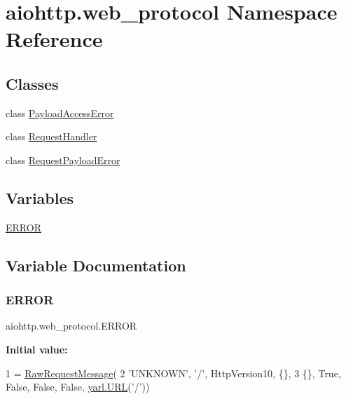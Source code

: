\hypertarget{namespaceaiohttp_1_1web__protocol}{}\section{aiohttp.\+web\+\_\+protocol Namespace Reference}
\label{namespaceaiohttp_1_1web__protocol}
\subsection*{Classes}
\begin{DoxyCompactItemize}
\item 
class \hyperlink{classaiohttp_1_1web__protocol_1_1_payload_access_error}{Payload\+Access\+Error}
\item 
class \hyperlink{classaiohttp_1_1web__protocol_1_1_request_handler}{Request\+Handler}
\item 
class \hyperlink{classaiohttp_1_1web__protocol_1_1_request_payload_error}{Request\+Payload\+Error}
\end{DoxyCompactItemize}
\subsection*{Variables}
\begin{DoxyCompactItemize}
\item 
\hyperlink{namespaceaiohttp_1_1web__protocol_aad702afbb023e0c5420a8e6bac3f2b90}{E\+R\+R\+OR}
\end{DoxyCompactItemize}


\subsection{Variable Documentation}
\mbox{\label{namespaceaiohttp_1_1web__protocol_aad702afbb023e0c5420a8e6bac3f2b90}} 
\subsubsection{\texorpdfstring{E\+R\+R\+OR}{ERROR}}
{\footnotesize\ttfamily aiohttp.\+web\+\_\+protocol.\+E\+R\+R\+OR}

{\bfseries Initial value\+:}
\begin{DoxyCode}
1 =  \hyperlink{namespaceaiohttp_1_1http__parser_a4145f5fa947ac335040e980b0dca95b4}{RawRequestMessage}(
2     \textcolor{stringliteral}{'UNKNOWN'}, \textcolor{stringliteral}{'/'}, HttpVersion10, \{\},
3     \{\}, \textcolor{keyword}{True}, \textcolor{keyword}{False}, \textcolor{keyword}{False}, \textcolor{keyword}{False}, \hyperlink{classyarl_1_1_u_r_l}{yarl.URL}(\textcolor{stringliteral}{'/'}))
\end{DoxyCode}
